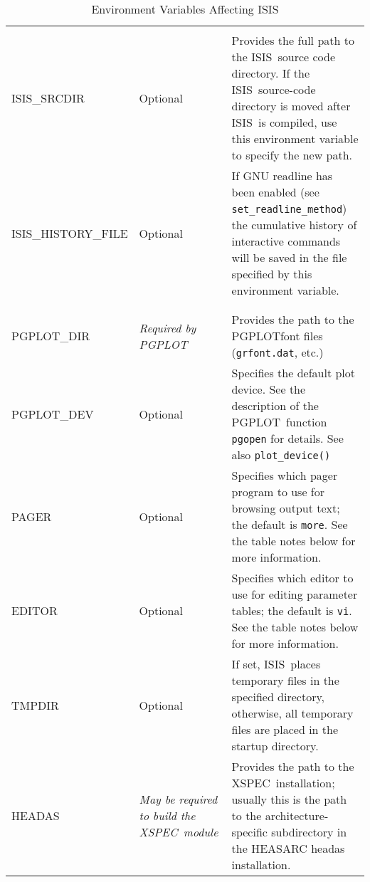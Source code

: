\documentclass{book}
\newcommand{\isisx}{{\sc ISIS~}}
\newcommand{\isis}{{\sc ISIS}}
\newcommand{\pgplot}{{\sc PGPLOT}}
\newcommand{\xspec}{{\sc XSPEC}}
\begin{document}
{\begin{samepage}
\begin{table}[ht] \caption{Environment Variables Affecting \isis}
\label{env-tbl}
\begin{tabular}{|l|p{0.8in}|p{3.2in}|}
\hline
\rule[-1mm]{0mm}{1mm} & & \hfill \\

{\sc ISIS\_SRCDIR} & Optional &
Provides the full path to the \isisx source code directory.
If the \isisx source-code directory is moved after \isisx is
compiled, use this environment variable to specify the new path.\\

{\sc ISIS\_HISTORY\_FILE} & Optional &
If GNU readline has been enabled (see \verb|set_readline_method|)
the cumulative history of interactive commands
will be saved in the file specified by this environment variable.\\

\rule[-1mm]{0mm}{1mm} & & \hfill \\
\hline
\rule[-1mm]{0mm}{1mm} & & \hfill \\

{\sc PGPLOT\_DIR} & {\it Required by \pgplot} &
Provides the path to the \pgplot font files ({\tt grfont.dat}, etc.)\\

{\sc PGPLOT\_DEV} & Optional &
Specifies the default plot device.  See the description of the \pgplot\
function {\tt pgopen} for details. See also \verb|plot_device()|\\

{\sc PAGER}  & Optional &
Specifies which pager program to use for browsing output text;
the default is {\tt more}.  See the table notes below for more
information.  \\

{\sc EDITOR} & Optional &
Specifies which editor to use for editing parameter tables; the default is
{\tt vi}.  See the table notes below for more
information. \\

{\sc TMPDIR} & Optional &
If set, \isisx places temporary files in the specified directory, otherwise,
all temporary files are placed in the startup directory. \\

{\sc HEADAS} & {\it May be required to build the \xspec\ module} &
Provides the path to the \xspec\ installation; usually this is the
path to the architecture-specific subdirectory
in the HEASARC headas installation. \\


\end{tabular}
\end{table}
\end{samepage}}
\end{document}
